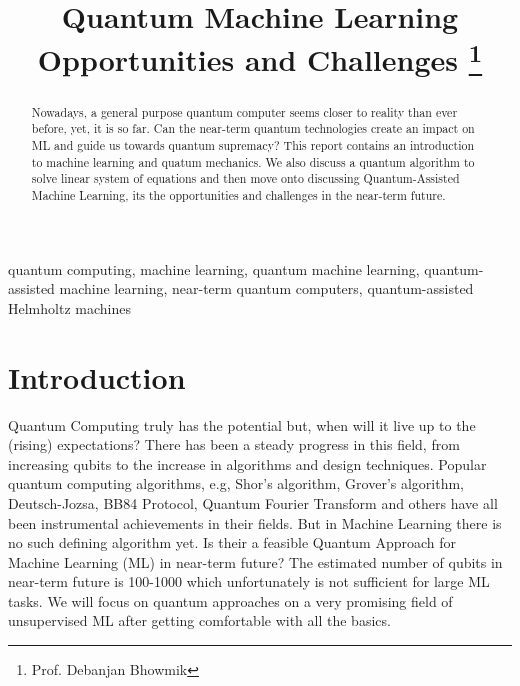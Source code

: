 \documentclass[conference]{IEEEtran}
\begin{document}
\title{Quantum Machine Learning\\
{\Large Opportunities and Challenges}
\thanks{Prof. Debanjan Bhowmik}
}
\author{
}

\maketitle 

\begin{abstract}
Nowadays, a general purpose quantum computer seems closer to reality than ever before, yet, it is so far. Can the near-term quantum technologies create an impact on ML and guide us towards quantum supremacy?
This report contains an introduction to machine learning and quatum mechanics. We also discuss a quantum algorithm to solve linear system of equations and then move onto discussing Quantum-Assisted Machine Learning, its the opportunities and challenges in the near-term future.
\end{abstract}
\begin{IEEEkeywords}
quantum computing, machine learning, quantum machine learning, quantum-assisted machine learning, near-term quantum computers, quantum-assisted Helmholtz machines
\end{IEEEkeywords}

\section{Introduction}
Quantum Computing truly has the potential but, when will it live up to the (rising) expectations?
There has been a steady progress in this field, from increasing qubits to the increase in algorithms and design techniques. Popular quantum computing algorithms, e.g, Shor's algorithm, Grover's algorithm, Deutsch-Jozsa, BB84 Protocol, Quantum Fourier Transform and others have all been instrumental achievements in their fields. But in Machine Learning there is no such defining algorithm yet. Is their a feasible Quantum Approach for Machine Learning (ML) in near-term future? The estimated number of qubits in near-term future is 100-1000 which unfortunately is not sufficient for large ML tasks. We will focus on quantum approaches on a very promising field of unsupervised ML after getting comfortable with all the basics.






\end{document}
